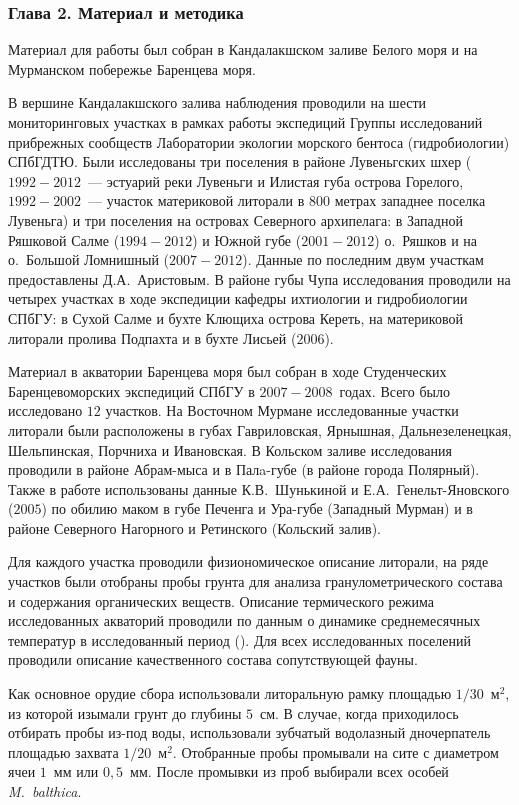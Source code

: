 \subsubsection*{Глава 2. Материал и методика}

Материал для работы был собран в Кандалакшском заливе Белого моря и на Мурманском побережье Баренцева моря.

В вершине Кандалакшского залива наблюдения проводили на шести мониторинговых участках в рамках работы экспедиций Группы исследований прибрежных сообществ Лаборатории экологии морского бентоса (гидробиологии) СПбГДТЮ. 
Были исследованы три поселения в районе Лувеньгских шхер ($1992 - 2012$~--- эстуарий реки Лувеньги и Илистая губа острова Горелого, $1992 - 2002$~--- участок материковой литорали в $800$ метрах западнее поселка Лувеньга) и три поселения на островах Северного архипелага: в Западной Ряшковой Салме ($1994 - 2012$) и Южной губе ($2001 - 2012$) о.~Ряшков и на о.~Большой Ломнишный ($2007 - 2012$).
Данные по последним двум участкам предоставлены Д.\:А.~Аристовым.
В районе губы Чупа исследования проводили на четырех участках в ходе экспедиции кафедры ихтиологии и гидробиологии СПбГУ: в Сухой Салме и бухте Клющиха острова Кереть, на материковой литорали пролива Подпахта и в бухте Лисьей ($2006$).

Материал  в акватории Баренцева моря  был  собран в ходе Студенческих Баренцевоморских экспедиций СПбГУ в $2007 - 2008$~годах. 
Всего было исследовано $12$ участков.
На Восточном   Мурмане исследованные участки литорали  были   расположены   в   губах   Гавриловская,  Ярнышная, Дальнезеленецкая, Шельпинская, Порчниха и Ивановская.
В   Кольском   заливе исследования проводили в районе Абрам-мыса и в Палa-губе (в районе города Полярный). 
Также в работе использованы данные К.\:В.~Шунькиной и Е.\:А.~Генельт-Яновского ($2005$) по обилию маком в губе Печенга и Ура-губе (Западный Мурман) и в районе Северного Нагорного и Ретинского (Кольский залив).

Для каждого участка проводили физиономическое описание литорали, на ряде участков были отобраны пробы грунта для анализа гранулометрического состава и содержания органических веществ.
Описание термического режима исследованных акваторий проводили по данным о динамике среднемесячных температур в исследованный период (\cite{KGZ_letopis, rp5_Kandalaksha, pinro}).
Для всех исследованных поселений проводили описание качественного состава сопутствующей фауны.

Как основное орудие сбора использовали литоральную рамку площадью $1/30$~м$^2$, из которой изымали грунт до глубины $5$~см. 
В случае, когда приходилось отбирать пробы из-под воды, использовали зубчатый водолазный дночерпатель площадью захвата $1/20$~м$^2$.
Отобранные пробы промывали на сите с диаметром ячеи $1$~мм или $0,5$~мм. 
После промывки из   проб   выбирали   всех   особей  {\it M.~balthica}.

